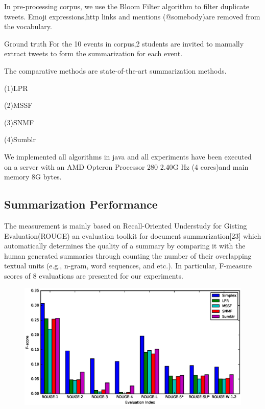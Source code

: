 \documentclass{llncs}
\begin{document}
In pre-processing corpus, we use the Bloom Filter algorithm to filter duplicate tweets. Emoji expressions,http links and mentions (@somebody)are removed from the vocabulary.


Ground truth For the 10 events in corpus,2 students are invited to manually extract tweets to form the summarization for each event.

The comparative methods are  state-of-the-art summarization methods.

(1)LPR

(2)MSSF

(3)SNMF

(4)Sumblr


We implemented all algorithms in java and all experiments have been executed on a server with an AMD Opteron Processor 280 2.40G Hz (4 cores)and main memory 8G bytes.

\subsection{Summarization Performance}

The measurement is mainly based on Recall-Oriented Understudy for Gisting Evaluation(ROUGE) an evaluation toolkit for document summarization[23] which automatically determines the quality of a summary by comparing it with the human generated summaries through counting the number of their overlapping textual units (e.g., n-gram, word sequences, and etc.). In particular, F-measure scores of 8 evaluations are presented for our experiments.


\begin{figure}
    \centering
    \includegraphics[scale=0.6]{rouge.eps}

\end{figure}
\end{document}
